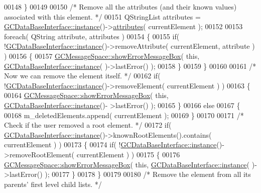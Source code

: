 \begin{DoxyCode}
{00148   \}
00149 
00150   \textcolor{comment}{/* Remove all the attributes (and their known values) associated with this
       element. */}
00151   QStringList attributes = \hyperlink{class_g_c_data_base_interface_a1baea9c0667aa8b610ec30076fcab84c}{GCDataBaseInterface::instance}()->\hyperlink{class_g_c_data_base_interface_afb1e49e08f98ca453f9ac66340a35642}{attributes}( 
      currentElement );
00152 
00153   \textcolor{keywordflow}{foreach}( QString attribute, attributes )
00154   \{
00155     \textcolor{keywordflow}{if}( !\hyperlink{class_g_c_data_base_interface_a1baea9c0667aa8b610ec30076fcab84c}{GCDataBaseInterface::instance}()->removeAttribute( currentElement, 
      attribute ) )
00156     \{
00157       \hyperlink{namespace_g_c_message_space_ab118b3a133686167617eb955029fd44e}{GCMessageSpace::showErrorMessageBox}( \textcolor{keyword}{this}, \hyperlink{class_g_c_data_base_interface_a1baea9c0667aa8b610ec30076fcab84c}{GCDataBaseInterface::instance}(
      )->lastError() );
00158     \}
00159   \}
00160 
00161   \textcolor{comment}{/* Now we can remove the element itself. */}
00162   \textcolor{keywordflow}{if}( !\hyperlink{class_g_c_data_base_interface_a1baea9c0667aa8b610ec30076fcab84c}{GCDataBaseInterface::instance}()->removeElement( currentElement ) )
00163   \{
00164     \hyperlink{namespace_g_c_message_space_ab118b3a133686167617eb955029fd44e}{GCMessageSpace::showErrorMessageBox}( \textcolor{keyword}{this}, \hyperlink{class_g_c_data_base_interface_a1baea9c0667aa8b610ec30076fcab84c}{GCDataBaseInterface::instance}()-
      >lastError() );
00165   \}
00166   \textcolor{keywordflow}{else}
00167   \{
00168     m\_deletedElements.append( currentElement );
00169   \}
00170 
00171   \textcolor{comment}{/* Check if the user removed a root element. */}
00172   \textcolor{keywordflow}{if}( \hyperlink{class_g_c_data_base_interface_a1baea9c0667aa8b610ec30076fcab84c}{GCDataBaseInterface::instance}()->knownRootElements().contains( 
      currentElement ) )
00173   \{
00174     \textcolor{keywordflow}{if}( !\hyperlink{class_g_c_data_base_interface_a1baea9c0667aa8b610ec30076fcab84c}{GCDataBaseInterface::instance}()->removeRootElement( currentElement ) )
00175     \{
00176       \hyperlink{namespace_g_c_message_space_ab118b3a133686167617eb955029fd44e}{GCMessageSpace::showErrorMessageBox}( \textcolor{keyword}{this}, \hyperlink{class_g_c_data_base_interface_a1baea9c0667aa8b610ec30076fcab84c}{GCDataBaseInterface::instance}(
      )->lastError() );
00177     \}
00178   \}
00179 
00180   \textcolor{comment}{/* Remove the element from all its parents' first level child lists. */}
}
\end{DoxyCode}
